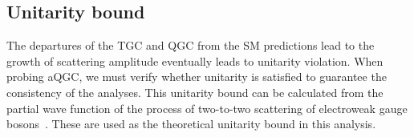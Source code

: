 
\subsection{Unitarity bound}
The departures of the TGC and QGC from the SM predictions lead to the growth of scattering amplitude eventually leads to unitarity violation.
When probing aQGC, we must verify whether unitarity is satisfied to guarantee the consistency of the analyses.
This unitarity bound can be calculated from the partial wave function of the process of two-to-two scattering of electroweak gauge bosons~\cite{PhysRevD.101.113003}.
These are used as the theoretical unitarity bound in this analysis.

